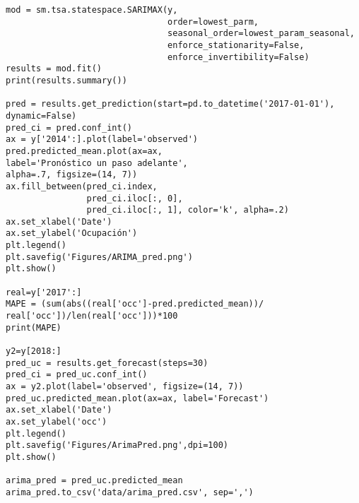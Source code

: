 \begin{verbatim}
mod = sm.tsa.statespace.SARIMAX(y,
                                order=lowest_parm,
                                seasonal_order=lowest_param_seasonal,
                                enforce_stationarity=False,
                                enforce_invertibility=False)
results = mod.fit()
print(results.summary())

pred = results.get_prediction(start=pd.to_datetime('2017-01-01'), dynamic=False)
pred_ci = pred.conf_int()
ax = y['2014':].plot(label='observed')
pred.predicted_mean.plot(ax=ax, 
label='Pronóstico un paso adelante', 
alpha=.7, figsize=(14, 7))
ax.fill_between(pred_ci.index,
                pred_ci.iloc[:, 0],
                pred_ci.iloc[:, 1], color='k', alpha=.2)
ax.set_xlabel('Date')
ax.set_ylabel('Ocupación')
plt.legend()
plt.savefig('Figures/ARIMA_pred.png')
plt.show()

real=y['2017':]
MAPE = (sum(abs((real['occ']-pred.predicted_mean))/
real['occ'])/len(real['occ']))*100
print(MAPE)

y2=y[2018:]
pred_uc = results.get_forecast(steps=30)
pred_ci = pred_uc.conf_int()
ax = y2.plot(label='observed', figsize=(14, 7))
pred_uc.predicted_mean.plot(ax=ax, label='Forecast')
ax.set_xlabel('Date')
ax.set_ylabel('occ')
plt.legend()
plt.savefig('Figures/ArimaPred.png',dpi=100)
plt.show()

arima_pred = pred_uc.predicted_mean
arima_pred.to_csv('data/arima_pred.csv', sep=',')








\end{verbatim}
